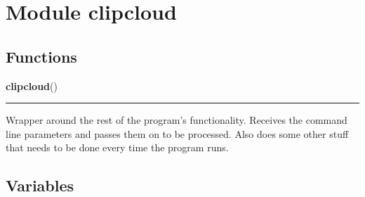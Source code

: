 %
%
%


\section{Module clipcloud}

    \label{clipcloud}


  \subsection{Functions}

    \label{clipcloud:clipcloud}

    \vspace{0.5ex}

\hspace{.8\funcindent}\begin{boxedminipage}{\funcwidth}

    \raggedright \textbf{clipcloud}()

    \vspace{-1.5ex}

    \rule{\textwidth}{0.5\fboxrule}
\setlength{\parskip}{2ex}
    Wrapper around the rest of the program's functionality. Receives the 
    command line parameters and passes them on to be processed. Also does 
    some other stuff that needs to be done every time the program runs.

\setlength{\parskip}{1ex}
    \end{boxedminipage}



  \subsection{Variables}


